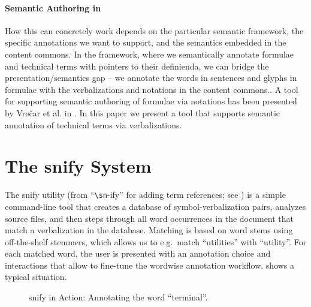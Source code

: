 \documentclass{llncs}
\newcommand\snify{\textsf{snify}\xspace}
\begin{document}
\paragraph{Semantic Authoring in \sTeX}
How this can concretely work depends on the particular semantic framework, the specific
annotations we want to support, and the semantics embedded in the content commons. In the
\sTeX framework, where we semantically annotate formulae and technical terms with pointers
to their definienda, we can bridge the presentation/semantics gap -- we annotate the words
in sentences and glyphs in formulae with the verbalizations and notations in the content
commons.. A tool for supporting semantic authoring of
formulae via notations has been presented by Vre{\v{c}}ar et al. in
\cite{VreWelKam:tsmmdui24}. In this paper we present a tool that supports semantic
annotation of technical terms via verbalizations.

  
\section{The \snify System}

The \snify utility (from ``\texttt{\textbackslash sn}-ify'' for adding term references;
see \cite{stextools:git}) is a simple command-line tool that creates a database of
symbol-verbalization pairs, analyzes \sTeX source files, and then steps through all word
occurrences in the document that match a verbalization in the database.  Matching is based
on word stems using off-the-shelf stemmers, which allows us to e.g.\ match ``utilities''
with ``utility''.  For each matched word, the user is presented with an annotation choice
and interactions that allow to fine-tune the wordwise annotation
workflow.  shows a typical situation.

\begin{figure}[ht]
  \setlength{\fboxsep}{0pt}
  \caption{\snify in Action: Annotating the word ``terminal''.}\label{fig:snify}
\end{figure}
\end{document}
